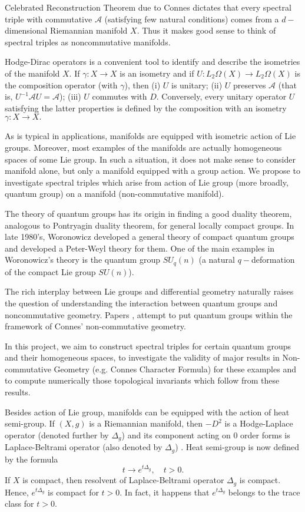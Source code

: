 \documentclass{article}
\begin{document}
Celebrated Reconstruction Theorem due to Connes \cite{Connes-reconstruction} dictates that every spectral triple with commutative $\mathcal{A}$ (satisfying few natural conditions) comes from a $d-$dimensional Riemannian manifold $X.$ Thus it makes good sense to think of spectral triples as noncommutative manifolds.


Hodge-Dirac operators is a convenient tool to identify and describe the isometries of the manifold $X.$ If $\gamma:X\to X$ is an isometry and if $U:L_2\Omega(X)\to L_2\Omega(X)$ is the composition operator (with $\gamma$), then (i) $U$ is unitary; (ii) $U$ preserves $\mathcal{A}$ (that is, $U^{-1}\mathcal{A}U=\mathcal{A}$); (iii) $U$ commutes with $D.$ Conversely, every unitary operator $U$ satisfying the latter properties is defined by the composition with an isometry $\gamma:X\to X.$

As is typical in applications, manifolds are equipped with isometric action of Lie groups. Moreover, most examples of the manifolds are actually homogeneous spaces of some Lie group.  In such a situation, it does not make sense to consider manifold alone, but only a manifold equipped with a group action. We propose to investigate spectral triples which arise from action of Lie group (more broadly, quantum group) on a manifold (non-commutative manifold).

The theory of quantum groups has its origin in finding a good duality theorem, analogous
to Pontryagin duality theorem, for general locally compact groups. In late 1980's, Woronowicz developed a general theory of compact quantum groups and developed a Peter-Weyl theory for them. One of the main examples in Woronowicz’s theory is the quantum group $SU_q(n)$ (a natural $q-$deformation of the compact Lie group $SU(n)$). 

The rich interplay between Lie groups and differential geometry naturally raises the question of understanding the interaction between quantum groups and noncommutative geometry. Papers \cite{ChakrabortyPal}, \cite{NeshTus} attempt to put quantum groups within the framework of Connes’ non-commutative geometry.

In this project, we aim to construct spectral triples for certain quantum groups and their homogeneous spaces, to investigate the validity of major results in Non-commutative Geometry (e.g. Connes Character Formula) for these examples and to compute numerically those topological invariants which follow from these results.

Besides action of Lie group, manifolds can be equipped with the action of heat semi-group. If $(X,g)$ is a Riemannian manifold, then $-D^2$ is a Hodge-Laplace operator (denoted further by $\Delta_g$) and its component acting on $0$ order forms is Laplace-Beltrami operator (also denoted by $\Delta_g$) \cite{Rosenberg}. Heat semi-group is now defined by the formula
$$t\to e^{t\Delta_g},\quad t>0.$$
If $X$ is compact, then resolvent of Laplace-Beltrami operator $\Delta_g$ is compact. Hence, $e^{t\Delta_g}$ is compact for $t>0.$ In fact, it happens that $e^{t\Delta_g}$ belongs to the trace class for $t>0.$
\end{document}
